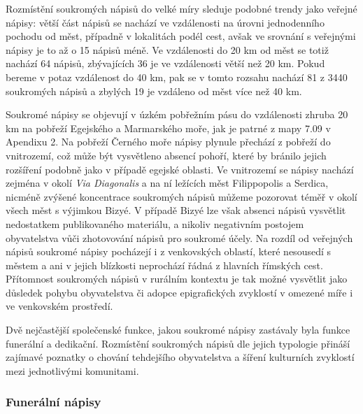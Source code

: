 Rozmístění soukromých nápisů do velké míry sleduje podobné trendy jako veřejné nápisy: větší část nápisů se nachází ve vzdálenosti na úrovni jednodenního pochodu od měst, případně v lokalitách podél cest, avšak ve srovnání s veřejnými nápisy je to až o 15  nápisů méně. Ve vzdálenosti do 20 km od měst se totiž nachází 64  nápisů, zbývajících 36  je ve vzdálenosti větší než 20 km. Pokud bereme v potaz vzdálenost do 40 km, pak se v tomto rozsahu nachází 81  z 3440 soukromých nápisů a zbylých 19  je vzdáleno od měst více než 40 km.

Soukromé nápisy se objevují v úzkém pobřežním pásu do vzdálenosti zhruba 20 km na pobřeží Egejského a Marmarského moře, jak je patrné z mapy 7.09 v Apendixu 2. Na pobřeží Černého moře nápisy plynule přechází z pobřeží do vnitrozemí, což může být vysvětleno absencí pohoří, které by bránilo jejich rozšíření podobně jako v případě egejské oblasti. Ve vnitrozemí se nápisy nachází zejména v okolí {\em Via Diagonalis} a na ní ležících měst Filippopolis a Serdica, nicméně zvýšené koncentrace soukromých nápisů můžeme pozorovat téměř v okolí všech měst s výjimkou Bizyé. V případě Bizyé lze však absenci nápisů vysvětlit nedostatkem publikovaného materiálu, a nikoliv negativním postojem obyvatelstva vůči zhotovování nápisů pro soukromé účely. Na rozdíl od veřejných nápisů soukromé nápisy pocházejí i z venkovských oblastí, které nesousedí s městem a ani v jejich blízkosti neprochází řádná z hlavních římských cest. Přítomnost soukromých nápisů v rurálním kontextu je tak možné vysvětlit jako důsledek pohybu obyvatelstva či adopce epigrafických zvyklostí v omezené míře i ve venkovském prostředí.

Dvě nejčastější společenské funkce, jakou soukromé nápisy zastávaly byla funkce funerální a dedikační. Rozmístění soukromých nápisů dle jejich typologie přináší zajímavé poznatky o chování tehdejšího obyvatelstva a šíření kulturních zvyklostí mezi jednotlivými komunitami.

\subsubsection[funerální-nápisy-19]{Funerální nápisy}

